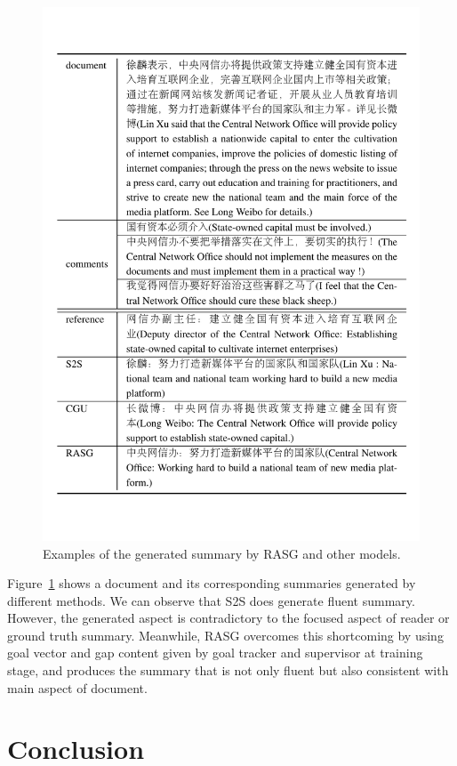 \documentclass[letterpaper]{article}
\begin{document}
\begin{figure}[!t]
    \centering
    \includegraphics[width=\linewidth]{figs/case.pdf}
    \caption{Examples of the generated summary by RASG and other models.}
    \label{tab:case}
\end{figure}

Figure~\ref{tab:case} shows a document and its corresponding summaries generated by different methods.
We can observe that S2S does generate fluent summary.
However, the generated aspect is contradictory to the focused aspect of reader or ground truth summary.
Meanwhile, RASG overcomes this shortcoming by using goal vector and gap content given by goal tracker and supervisor at training stage, and produces the summary that is not only fluent but also consistent with main aspect of document.


\section{Conclusion}
\end{document}
